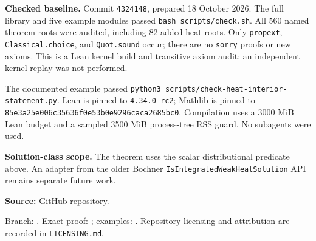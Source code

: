 \documentclass[11pt,letterpaper]{article}
\begin{document}
\textbf{Checked baseline.} Commit \texttt{4324148}, prepared 18 October 2026.
The full library and five example modules passed
\texttt{bash scripts/check.sh}. All 560 named theorem roots were audited,
including 82 added heat roots. Only \texttt{propext}, \texttt{Classical.choice},
and \texttt{Quot.sound} occur; there are no \texttt{sorry} proofs or new axioms.
This is a Lean kernel build and transitive axiom audit; an independent kernel
replay was not performed.

The documented example passed
\texttt{python3 scripts/check-heat-interior-statement.py}.
Lean is pinned to \texttt{4.34.0-rc2}; Mathlib is pinned to
\texttt{85e3a25e006c35636f0e53b0e9296caca2685bc0}.
Compilation uses a 3000 MiB Lean budget and a sampled 3500 MiB process-tree
RSS guard. No subagents were used.

\textbf{Solution-class scope.} The theorem uses the scalar distributional
predicate above. An adapter from the older Bochner
\texttt{IsIntegratedWeakHeatSolution} API remains separate future work.

\small
\textbf{Source:} \href{https://github.com/edcrfv/Fluid-PDEs-in-Lean-Foundation}{GitHub repository}.\par
Branch: . Exact proof:
; examples:
. Repository licensing and attribution
are recorded in \texttt{LICENSING.md}.
\end{document}

